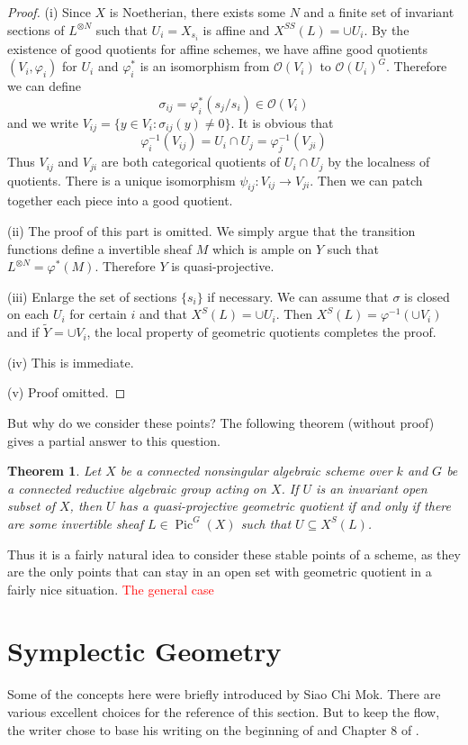 \documentclass[12pt]{report}
\newtheorem{theorem}{Theorem}[section]
\theoremstyle{remark}
\theoremstyle{definition}
\newcommand{\s}[0]{\sigma}
\newcommand{\Pic}[0]{\operatorname{Pic}}
\begin{document}
    \begin{proof}
        (i) Since $X$ is Noetherian, there exists some $N$ and a finite set of invariant sections of $L^{\otimes N}$ such that $U_i=X_{s_i}$ is affine and $X^{SS}(L)=\cup U_i$. By the existence of good quotients for affine schemes, we have affine good quotients $(V_i,\varphi_i)$ for $U_i$ and $\varphi_i^*$ is an isomorphism from $\mathcal O(V_i)$ to $\mathcal O(U_i)^G$. Therefore we can define
        \[\s_{ij}=\varphi_i^*(s_j/s_i)\in\mathcal O(V_i)\]
        and we write $V_{ij}=\{y\in V_i:\s_{ij}(y)\neq 0\}$. It is obvious that
        \[\varphi_i^{-1}(V_{ij})=U_i\cap U_j=\varphi_j^{-1}(V_{ji})\]
        Thus $V_{ij}$ and $V_{ji}$ are both categorical quotients of $U_i\cap U_j$ by the localness of quotients. There is a unique isomorphism $\psi_{ij}:V_{ij}\to V_{ji}$. Then we can patch together each piece into a good quotient.

        (ii) The proof of this part is omitted. We simply argue that the transition functions define a invertible sheaf $M$ which is ample on $Y$ such that $L^{\otimes N}=\varphi^*(M)$. Therefore $Y$ is quasi-projective.

        (iii) Enlarge the set of sections $\{s_i\}$ if necessary. We can assume that $\s$ is closed on each $U_i$ for certain $i$ and that $X^S(L)=\cup U_i$. Then $X^S(L)=\varphi^{-1}(\cup V_i)$ and if $\tilde Y=\cup V_i$, the local property of geometric quotients completes the proof.

        (iv) This is immediate.
        
        (v) Proof omitted.
    \end{proof}
    But why do we consider these points? The following theorem (without proof) gives a partial answer to this question.
    \begin{theorem}
        Let $X$ be a connected nonsingular algebraic scheme over $k$ and $G$ be a connected reductive algebraic group acting on $X$. If $U$ is an invariant open subset of $X$, then $U$ has a quasi-projective geometric quotient if and only if there are some invertible sheaf $L\in\Pic^G(X)$ such that $U\subseteq X^S(L)$. 
    \end{theorem}
    Thus it is a fairly natural idea to consider these stable points of a scheme, as they are the only points that can stay in an open set with geometric quotient in a fairly nice situation.
    \textcolor{red}{The general case}


    \section{Symplectic Geometry}
    Some of the concepts here were briefly introduced by Siao Chi Mok.
    There are various excellent choices for the reference of this section. But to keep the flow, the writer chose to base his writing on the beginning of \cite{chriss_2009_representation} and Chapter 8 of \cite{mumford_1994_geometric}.
\end{document}
